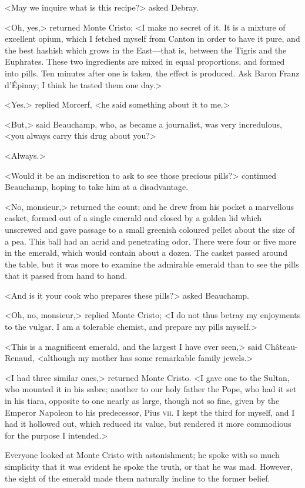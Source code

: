  <May we inquire what is this recipe?> asked Debray. 

 <Oh, yes,> returned Monte Cristo; <I make no secret of it. It is a mixture of excellent opium, which I fetched myself from Canton in order to have it pure, and the best hashish which grows in the East—that is, between the Tigris and the Euphrates. These two ingredients are mixed in equal proportions, and formed into pills. Ten minutes after one is taken, the effect is produced. Ask Baron Franz d'Épinay; I think he tasted them one day.> 

 <Yes,> replied Morcerf, <he said something about it to me.> 

 <But,> said Beauchamp, who, as became a journalist, was very incredulous, <you always carry this drug about you?> 

 <Always.> 

 <Would it be an indiscretion to ask to see those precious pills?> continued Beauchamp, hoping to take him at a disadvantage. 

 <No, monsieur,> returned the count; and he drew from his pocket a marvellous casket, formed out of a single emerald and closed by a golden lid which unscrewed and gave passage to a small greenish coloured pellet about the size of a pea. This ball had an acrid and penetrating odor. There were four or five more in the emerald, which would contain about a dozen. The casket passed around the table, but it was more to examine the admirable emerald than to see the pills that it passed from hand to hand. 

 <And is it your cook who prepares these pills?> asked Beauchamp. 

 <Oh, no, monsieur,> replied Monte Cristo; <I do not thus betray my enjoyments to the vulgar. I am a tolerable chemist, and prepare my pills myself.> 

 <This is a magnificent emerald, and the largest I have ever seen,> said Château-Renaud, <although my mother has some remarkable family jewels.> 

 <I had three similar ones,> returned Monte Cristo. <I gave one to the Sultan, who mounted it in his sabre; another to our holy father the Pope, who had it set in his tiara, opposite to one nearly as large, though not so fine, given by the Emperor Napoleon to his predecessor, Pius \textsc{vii.} I kept the third for myself, and I had it hollowed out, which reduced its value, but rendered it more commodious for the purpose I intended.> 

 Everyone looked at Monte Cristo with astonishment; he spoke with so much simplicity that it was evident he spoke the truth, or that he was mad. However, the sight of the emerald made them naturally incline to the former belief. 

